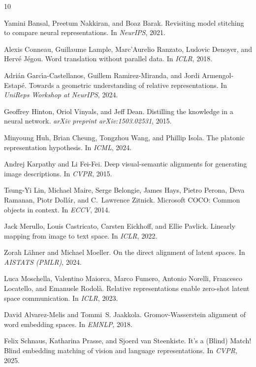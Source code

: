 \documentclass{article}
\begin{document}
\begin{thebibliography}{10}

Yamini Bansal, Preetum Nakkiran, and Boaz Barak.
\newblock Revisiting model stitching to compare neural representations.
\newblock In \emph{NeurIPS}, 2021.

Alexis Conneau, Guillaume Lample, Marc'Aurelio Ranzato, Ludovic Denoyer, and Herv{\'e} J{\'e}gou.
\newblock Word translation without parallel data.
\newblock In \emph{ICLR}, 2018.

Adri{\'a}n Garc{\'\i}a-Castellanos, Guillem Ramirez-Miranda, and Jordi Armengol-Estap{\'e}.
\newblock Towards a geometric understanding of relative representations.
\newblock In \emph{UniReps Workshop at NeurIPS}, 2024.

Geoffrey Hinton, Oriol Vinyals, and Jeff Dean.
\newblock Distilling the knowledge in a neural network.
\newblock \emph{arXiv preprint arXiv:1503.02531}, 2015.

Minyoung Huh, Brian Cheung, Tongzhou Wang, and Phillip Isola.
\newblock The platonic representation hypothesis.
\newblock In \emph{ICML}, 2024.

Andrej Karpathy and Li Fei-Fei.
\newblock Deep visual-semantic alignments for generating image descriptions.
\newblock In \emph{CVPR}, 2015.

Tsung-Yi Lin, Michael Maire, Serge Belongie, James Hays, Pietro Perona, Deva Ramanan, Piotr Doll{\'a}r, and C.~Lawrence Zitnick.
\newblock Microsoft {COCO}: Common objects in context.
\newblock In \emph{ECCV}, 2014.

Jack Merullo, Louis Castricato, Carsten Eickhoff, and Ellie Pavlick.
\newblock Linearly mapping from image to text space.
\newblock In \emph{ICLR}, 2022.

Zorah L\"ahner and Michael Moeller.
\newblock On the direct alignment of latent spaces.
\newblock In \emph{AISTATS (PMLR)}, 2024.

Luca Moschella, Valentino Maiorca, Marco Fumero, Antonio Norelli, Francesco Locatello, and Emanuele Rodol{\`a}.
\newblock Relative representations enable zero-shot latent space communication.
\newblock In \emph{ICLR}, 2023.

David Alvarez-Melis and Tommi~S. Jaakkola.
\newblock Gromov-{W}asserstein alignment of word embedding spaces.
\newblock In \emph{EMNLP}, 2018.

Felix Schnaus, Katharina Prasse, and Sjoerd van Steenkiste.
\newblock It's a ({B}lind) {M}atch! {B}lind embedding matching of vision and language representations.
\newblock In \emph{CVPR}, 2025.

\end{thebibliography}
\end{document}
